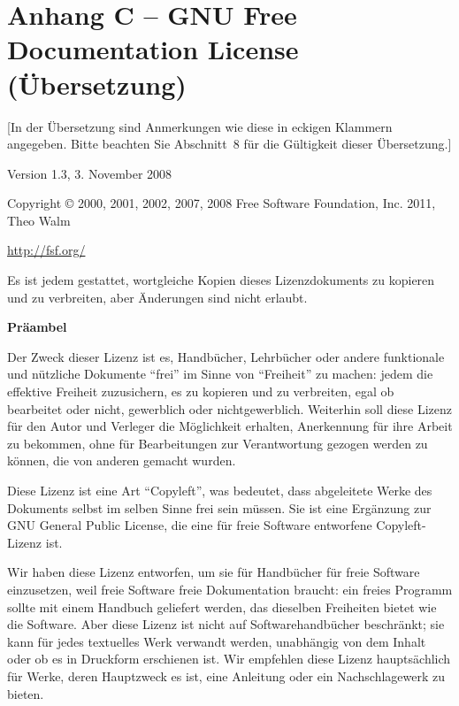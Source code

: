 \chapter{Anhang C – GNU Free Documentation License (Übersetzung)}


\begin{center}

[In der Übersetzung sind Anmerkungen wie diese in eckigen Klammern angegeben. Bitte beachten Sie Abschnitt~8 für die Gültigkeit dieser Übersetzung.]
\bigskip

Version 1.3, 3. November 2008

Copyright \copyright{} 2000, 2001, 2002, 2007, 2008  Free Software Foundation, Inc.
2011, Theo Walm
 
\bigskip
\url{http://fsf.org/} 
\bigskip

Es ist jedem gestattet, wortgleiche Kopien dieses Lizenzdokuments
zu kopieren und zu verbreiten, aber Änderungen
sind nicht erlaubt.

\bigskip

{\bf\large Präambel}
\end{center}

Der Zweck dieser Lizenz ist es, Handbücher, Lehrbücher oder andere
funktionale und nützliche Dokumente "`frei"' im Sinne von "`Freiheit"' zu machen:
jedem die effektive Freiheit zuzusichern, es zu kopieren und zu verbreiten,
egal ob bearbeitet oder nicht, gewerblich oder nichtgewerblich.
Weiterhin soll diese Lizenz für den Autor und Verleger die Möglichkeit erhalten,
Anerkennung für ihre Arbeit zu bekommen, ohne für Bearbeitungen zur Verantwortung 
gezogen werden zu können, die von anderen gemacht wurden.

Diese Lizenz ist eine Art "`Copyleft"', was bedeutet, dass abgeleitete Werke
des Dokuments selbst im selben Sinne frei sein müssen. Sie ist eine Ergänzung 
zur GNU General Public License, die eine für freie Software entworfene
Copyleft-Lizenz ist.

Wir haben diese Lizenz entworfen, um sie für Handbücher für freie Software
einzusetzen, weil freie Software freie Dokumentation braucht: ein freies
Programm sollte mit einem Handbuch geliefert werden, das dieselben Freiheiten bietet 
wie die Software. Aber diese Lizenz ist nicht auf Softwarehandbücher beschränkt;
sie kann für jedes textuelles Werk verwandt werden, unabhängig von dem Inhalt
oder ob es in Druckform erschienen ist. Wir empfehlen diese Lizenz
hauptsächlich für Werke, deren Hauptzweck es ist, eine Anleitung oder ein 
Nachschlagewerk zu bieten.

